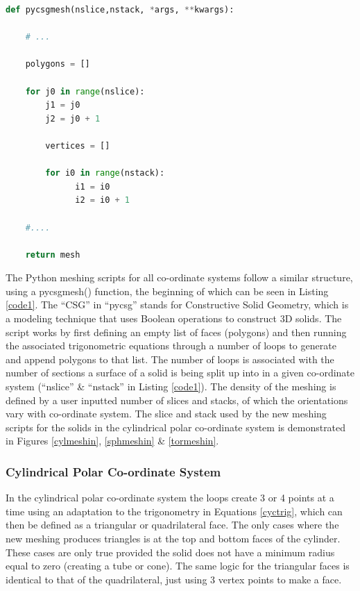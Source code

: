\documentclass[12pt,a4paper]{article}
\begin{document}
\begin{lstlisting}[language=Python, label=code1, caption=Basic Python script structure for new meshing of primitive solid in Pyg4ometry.]
def pycsgmesh(nslice,nstack, *args, **kwargs):

    # ... 
    
    polygons = []

    for j0 in range(nslice):
        j1 = j0
        j2 = j0 + 1
    
        vertices = []

        for i0 in range(nstack):
              i1 = i0
              i2 = i0 + 1     
              
    #....
    
    return mesh

\end{lstlisting}


\noindent The Python meshing scripts for all co-ordinate systems follow a similar structure, using a pycsgmesh() function, the beginning of which can be seen in Listing \ref{code1}. The ``CSG'' in ``pycsg'' stands for Constructive Solid Geometry, which is a  modeling technique that uses Boolean operations to construct 3D solids. The script works by  first defining an empty list of faces (polygons) and then running the associated trigonometric equations through a number of loops to generate and append polygons to that list. The number of loops is associated with the number of sections a surface of a solid is being split up into in a given co-ordinate system (``nslice'' \& ``nstack'' in Listing \ref{code1}). The density of the meshing is defined by a user inputted number of slices and stacks, of which the orientations vary with co-ordinate system. The slice and stack used by the new meshing scripts for the solids in the cylindrical polar co-ordinate system is demonstrated in Figures \ref{cylmeshin}, \ref{sphmeshin} \& \ref{tormeshin}.

\subsubsection{Cylindrical Polar Co-ordinate System}
\label{cycl}
In the cylindrical polar co-ordinate system the loops create 3 or 4 points at a time using an adaptation to the trigonometry in Equations \ref{cyctrig}, which can then be defined as a triangular or quadrilateral face. The only cases where the new meshing produces triangles is at the top and bottom faces of the cylinder. These cases are only true provided the solid does not have a minimum radius equal to zero (creating a tube or cone). The same logic for the triangular faces is identical to that of the quadrilateral, just using 3 vertex points to make a face.
\end{document}
